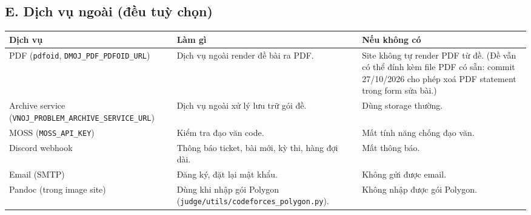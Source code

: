 \documentclass[11pt,a4paper]{article}
\renewcommand{\c}[1]{\texttt{#1}}
\begin{document}
\subsection*{E. Dịch vụ ngoài (đều tuỳ chọn)}
\begin{tabularx}{\textwidth}{@{}>{\raggedright}p{3.6cm}X>{\raggedright\arraybackslash}p{4.2cm}@{}}
\toprule
Dịch vụ & Làm gì & Nếu không có \\
\midrule
PDF (\c{pdfoid}, \c{DMOJ\_PDF\_PDFOID\_URL}) & Dịch vụ ngoài render đề bài ra PDF. & Site không tự render PDF từ đề. (Đề vẫn có thể đính kèm file PDF có sẵn: commit 27/10/2026 cho phép xoá PDF statement trong form sửa bài.) \\
Archive service (\c{VNOJ\_PROBLEM\_ARCHIVE\_SERVICE\_URL}) & Dịch vụ ngoài xử lý lưu trữ gói đề. & Dùng storage thường. \\
MOSS (\c{MOSS\_API\_KEY}) & Kiểm tra đạo văn code. & Mất tính năng chống đạo văn. \\
Discord webhook & Thông báo ticket, bài mới, kỳ thi, hàng đợi dài. & Mất thông báo. \\
Email (SMTP) & Đăng ký, đặt lại mật khẩu. & Không gửi được email. \\
Pandoc (trong image site) & Dùng khi nhập gói Polygon (\c{judge/utils/codeforces\_polygon.py}). & Không nhập được gói Polygon. \\
\bottomrule
\end{tabularx}
\end{document}
